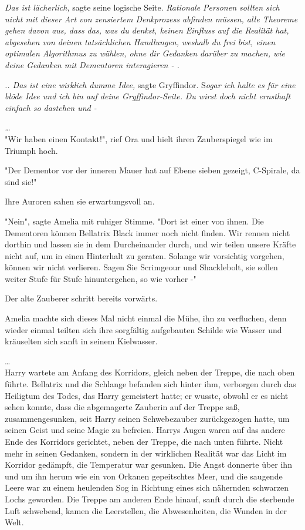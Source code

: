 {\emph{Das ist lächerlich,} sagte seine logische Seite. \emph{Rationale Personen sollten sich nicht mit dieser Art von zensiertem Denkprozess abfinden müssen, alle Theoreme gehen davon aus, dass das, was du denkst, keinen Einfluss auf die Realität hat, abgesehen von deinen tatsächlichen Handlungen, weshalb du frei bist, einen optimalen Algorithmus zu wählen, ohne dir Gedanken darüber zu machen, wie deine Gedanken mit Dementoren interagieren - .}

\emph{.. Das ist eine wirklich dumme Idee,} sagte Gryffindor. S\emph{ogar ich halte es für eine} \emph{blöde Idee und ich bin auf deine Gryffindor-Seite.} \emph{Du wirst doch nicht ernsthaft einfach so dastehen und -}

\emph{…}\\ "Wir haben einen Kontakt!", rief Ora und hielt ihren Zauberspiegel wie im Triumph hoch.

"Der Dementor vor der inneren Mauer hat auf Ebene sieben gezeigt, C-Spirale, da sind sie!"

Ihre Auroren sahen sie erwartungsvoll an.

"Nein", sagte Amelia mit ruhiger Stimme. "Dort ist einer von ihnen. Die Dementoren können Bellatrix Black immer noch nicht finden. Wir rennen nicht dorthin und lassen sie in dem Durcheinander durch, und wir teilen unsere Kräfte nicht auf, um in einen Hinterhalt zu geraten. Solange wir vorsichtig vorgehen, können wir nicht verlieren. Sagen Sie Scrimgeour und Shacklebolt, sie sollen weiter Stufe für Stufe hinuntergehen, so wie vorher -"

Der alte Zauberer schritt bereits vorwärts.

Amelia machte sich dieses Mal nicht einmal die Mühe, ihn zu verfluchen, denn wieder einmal teilten sich ihre sorgfältig aufgebauten Schilde wie Wasser und kräuselten sich sanft in seinem Kielwasser.

…\\ Harry wartete am Anfang des Korridors, gleich neben der Treppe, die nach oben führte. Bellatrix und die Schlange befanden sich hinter ihm, verborgen durch das Heiligtum des Todes, das Harry gemeistert hatte; er wusste, obwohl er es nicht sehen konnte, dass die abgemagerte Zauberin auf der Treppe saß, zusammengesunken, seit Harry seinen Schwebezauber zurückgezogen hatte, um seinen Geist und seine Magie zu befreien. Harrys Augen waren auf das andere Ende des Korridors gerichtet, neben der Treppe, die nach unten führte. Nicht mehr in seinen Gedanken, sondern in der wirklichen Realität war das Licht im Korridor gedämpft, die Temperatur war gesunken. Die Angst donnerte über ihn und um ihn herum wie ein von Orkanen gepeitschtes Meer, und die saugende Leere war zu einem heulenden Sog in Richtung eines sich nähernden schwarzen Lochs geworden. Die Treppe am anderen Ende hinauf, sanft durch die sterbende Luft schwebend, kamen die Leerstellen, die Abwesenheiten, die Wunden in der Welt.

}
